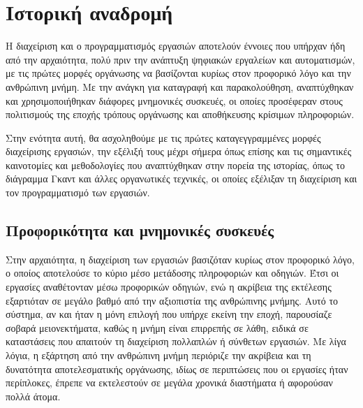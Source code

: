     \section{Ιστορική αναδρομή}
        Η διαχείριση και ο προγραμματισμός εργασιών αποτελούν έννοιες που υπήρχαν ήδη από την αρχαιότητα, πολύ πριν την ανάπτυξη ψηφιακών εργαλείων και αυτοματισμών, με τις πρώτες μορφές οργάνωσης να βασίζονται κυρίως στον προφορικό λόγο και την ανθρώπινη μνήμη. Με την ανάγκη για καταγραφή και παρακολούθηση, αναπτύχθηκαν και χρησιμοποιήθηκαν διάφορες μνημονικές συσκευές, οι οποίες προσέφεραν στους πολιτισμούς της εποχής τρόπους οργάνωσης και αποθήκευσης κρίσιμων πληροφοριών.

        Στην ενότητα αυτή, θα ασχοληθούμε με τις πρώτες καταγεγγραμμένες μορφές διαχείρισης εργασιών, την εξέλιξή τους μέχρι σήμερα όπως επίσης και τις σημαντικές καινοτομίες και μεθοδολογίες που αναπτύχθηκαν στην πορεία της ιστορίας, όπως το διάγραμμα Γκαντ και άλλες οργανωτικές τεχνικές, οι οποίες εξέλιξαν τη διαχείριση και τον προγραμματισμό των εργασιών.



        \subsection{Προφορικότητα και μνημονικές συσκευές}
            Στην αρχαιότητα, η διαχείριση των εργασιών βασιζόταν κυρίως στον προφορικό λόγο, ο οποίος αποτελούσε το κύριο μέσο μετάδοσης πληροφοριών και οδηγιών. Έτσι οι εργασίες αναθέτονταν μέσω προφορικών οδηγιών, ενώ η ακρίβεια της εκτέλεσης εξαρτιόταν σε μεγάλο βαθμό από την αξιοπιστία της ανθρώπινης μνήμης. Αυτό το σύστημα, αν και ήταν η μόνη επιλογή που υπήρχε εκείνη την εποχή, παρουσίαζε σοβαρά μειονεκτήματα, καθώς η μνήμη είναι επιρρεπής σε λάθη, ειδικά σε καταστάσεις που απαιτούν τη διαχείριση πολλαπλών ή σύνθετων εργασιών. Με λίγα λόγια, η εξάρτηση από την ανθρώπινη μνήμη περιόριζε την ακρίβεια και τη δυνατότητα αποτελεσματικής οργάνωσης, ιδίως σε περιπτώσεις που οι εργασίες ήταν περίπλοκες, έπρεπε να εκτελεστούν σε μεγάλα χρονικά διαστήματα ή αφορούσαν πολλά άτομα. \cite{Goody2013}

